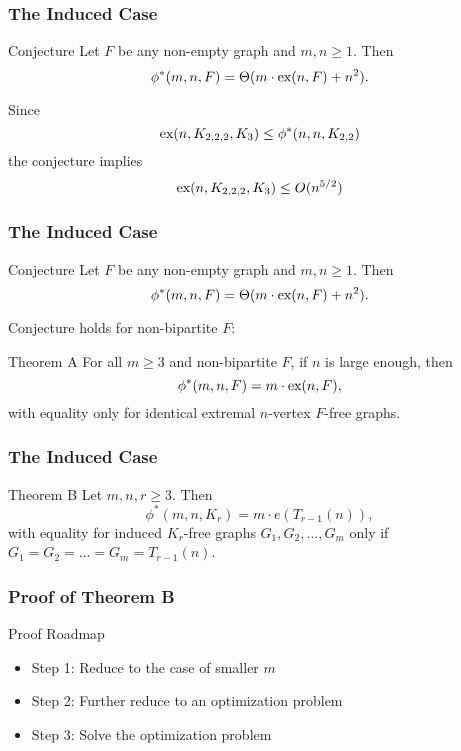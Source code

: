 \documentclass{beamer}
\newcommand*{\ex}{\textnormal{ex}}
\begin{document}
\begin{frame}
  \frametitle{The Induced Case}

  \begin{block}{Conjecture}
    Let $F$ be any non-empty graph and $m, n \geq 1$. Then
    \[ 
      \phi^*(m,n,F) = \Theta(m \cdot \ex(n,F) + n^2).
    \]
  \end{block}

  \vspace{0.3cm}

  Since
  \[
    \ex(n, K_{2, 2, 2}, K_3) \leq \phi^*(n, n, K_{2, 2})
  \]
  the conjecture implies
  \[
    \ex(n, K_{2, 2, 2}, K_3) \leq O(n^{5/2})
  \]
\end{frame}

\begin{frame}
  \frametitle{The Induced Case}

  \begin{block}{Conjecture}
    Let $F$ be any non-empty graph and $m, n \geq 1$. Then
    \[ 
      \phi^*(m,n,F) = \Theta(m \cdot \ex(n,F) + n^2).
    \]
  \end{block}

  \vspace{0.3cm}

  Conjecture holds for non-bipartite $F$:

  \begin{block}{Theorem A}
    For all $m \geq 3$ and non-bipartite $F$, if $n$ is large enough, then
    \[
      \phi^*(m, n, F) = m \cdot \ex(n, F),
    \]
    with equality only for identical extremal $n$-vertex $F$-free graphs.
  \end{block}
\end{frame}

\begin{frame}
  \frametitle{The Induced Case}

  \begin{block}{Theorem B}
    Let $m, n, r \geq 3$. Then 
    \[
      \phi^*(m,n,K_{r}) = m \cdot e(T_{r - 1}(n)),
    \]
    with equality for induced $K_{r}$-free graphs $G_1, G_2, \dots, G_m$ only if $G_1 = G_2 = \dots = G_m = T_{r - 1}(n)$.  
  \end{block}
\end{frame}

\begin{frame}
  \frametitle{Proof of Theorem B}

  Proof Roadmap

  \begin{itemize}
    \item Step 1: Reduce to the case of smaller $m$
    \item Step 2: Further reduce to an optimization problem
    \item Step 3: Solve the optimization problem
  \end{itemize}
\end{frame}
\end{document}
